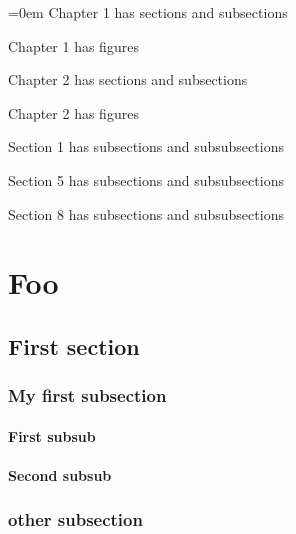 \documentclass{book}
\begin{document}
\tableofcontents


\cleardoublepage
\markboth{}{}
\begingroup
\parindent=0em
Chapter 1 has  sections and  subsections

Chapter 1 has  figures

Chapter 2 has  sections and  subsections

Chapter 2 has  figures

Section 1 has  subsections and  subsubsections

Section 5 has  subsections and  subsubsections

Section 8 has  subsections and  subsubsections
\endgroup



\chapter{Foo}


\section{First section}

\subsection{My first subsection}

\subsubsection{First subsub}

\subsubsection{Second subsub}


\subsection{other subsection}
\end{document}
